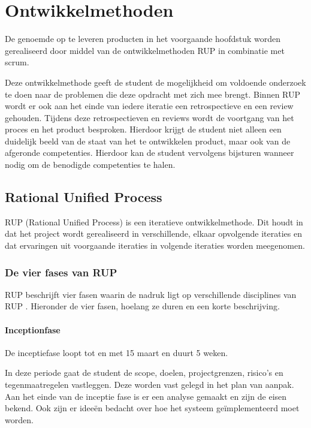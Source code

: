 \documentclass[a4paper, 11pt, oneside]{report}
\begin{document}
\chapter{Ontwikkelmethoden}
\label{chapter:ontwikkelmethode}
De genoemde op te leveren producten in het voorgaande hoofdstuk worden gerealiseerd door middel van de ontwikkelmethoden RUP in combinatie met scrum.

Deze ontwikkelmethode geeft de student de mogelijkheid om voldoende onderzoek te doen naar de problemen die deze opdracht met zich mee brengt. 
Binnen RUP wordt er ook aan het einde van iedere iteratie een retrospectieve en een review gehouden. Tijdens deze retrospectieven en reviews wordt de voortgang van het proces en het product besproken. Hierdoor krijgt de student niet alleen een duidelijk beeld van de staat van het te ontwikkelen product, maar ook van de afgeronde competenties. Hierdoor kan de student vervolgens bijsturen wanneer nodig om de benodigde competenties te halen.

\section{Rational Unified Process} 

RUP (Rational Unified Process) is een iteratieve ontwikkelmethode. Dit houdt in dat het project
wordt gerealiseerd in verschillende, elkaar opvolgende iteraties en dat ervaringen uit voorgaande iteraties in volgende iteraties worden meegenomen.\cite{RUP}

\subsection{De vier fases van RUP}
\label{sec:fasesRUP}
RUP beschrijft vier fasen waarin de nadruk ligt op verschillende disciplines van RUP \cite{RUPwim}.
Hieronder de vier fasen, hoelang ze duren en een korte beschrijving.

\subsubsection{Inceptionfase}
\label{sec:inceptionfase}
De inceptiefase loopt tot en met 15 maart en duurt 5 weken.

In deze periode gaat de student de scope, doelen, projectgrenzen, risico's en tegenmaatregelen vastleggen.
Deze worden vast gelegd in het plan van aanpak.
Aan het einde van de inceptie fase is er een analyse gemaakt en zijn de eisen bekend.
Ook zijn er ideeën bedacht over hoe het systeem geïmplementeerd moet worden.
\end{document}
